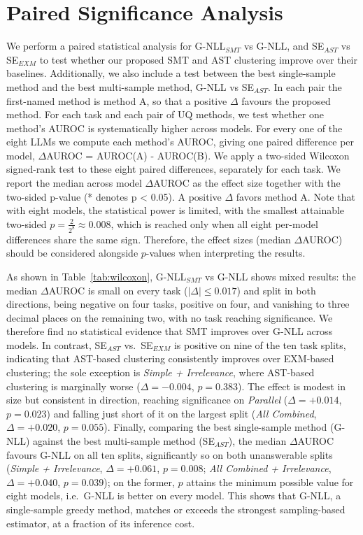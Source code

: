 \section{Paired Significance Analysis}
\label{app:paired_significance}
We perform a paired statistical analysis for G-NLL$_{SMT}$ vs G-NLL, and SE$_{AST}$ vs SE$_{EXM}$ to test whether our proposed SMT and AST clustering improve over their baselines. Additionally, we also include a test between the best single-sample method and the best multi-sample method, G-NLL vs SE$_{AST}$. In each pair the first-named method is method A, so that a positive $\Delta$ favours the proposed method. For each task and each pair of UQ methods, we test whether one method's AUROC is systematically higher across models. For every one of the eight LLMs we compute each method's AUROC, giving one paired difference per model, $\Delta$AUROC = AUROC(A) - AUROC(B). We apply a two-sided Wilcoxon signed-rank test to these eight paired differences, separately for each task. We report the median across model $\Delta$AUROC as the effect size together with the two-sided p-value (* denotes p < 0.05). A positive $\Delta$ favors method A. Note that with eight models, the statistical power is limited, with the smallest attainable two-sided $p = \frac{2}{2^{8}} \approx 0.008$, which is reached only when all eight per-model differences share the same sign. Therefore, the effect sizes (median $\Delta$AUROC) should be considered alongside $p$-values when interpreting the results.

As shown in Table~\ref{tab:wilcoxon}, G-NLL$_{SMT}$ vs G-NLL shows mixed results: the median $\Delta$AUROC is small on every task ($|\Delta| \leq 0.017$) and split in both directions, being negative on four tasks, positive on four, and vanishing to three decimal places on the remaining two, with no task reaching significance. We therefore find no statistical evidence that SMT improves over G-NLL across models. In contrast, SE$_{AST}$ vs.\ SE$_{EXM}$ is positive on nine of the ten task splits, indicating that AST-based clustering consistently improves over EXM-based clustering; the sole exception is \emph{Simple + Irrelevance}, where AST-based clustering is marginally worse ($\Delta = -0.004$, $p = 0.383$). The effect is modest in size but consistent in direction, reaching significance on \emph{Parallel} ($\Delta = +0.014$, $p = 0.023$) and falling just short of it on the largest split (\emph{All Combined}, $\Delta = +0.020$, $p = 0.055$). Finally, comparing the best single-sample method (G-NLL) against the best multi-sample method (SE$_{AST}$), the median $\Delta$AUROC favours G-NLL on all ten splits, significantly so on both unanswerable splits (\emph{Simple + Irrelevance}, $\Delta = +0.061$, $p = 0.008$; \emph{All Combined + Irrelevance}, $\Delta = +0.040$, $p = 0.039$); on the former, $p$ attains the minimum possible value for eight models, i.e.\ G-NLL is better on every model. This shows that G-NLL, a single-sample greedy method, matches or exceeds the strongest sampling-based estimator, at a fraction of its inference cost.



